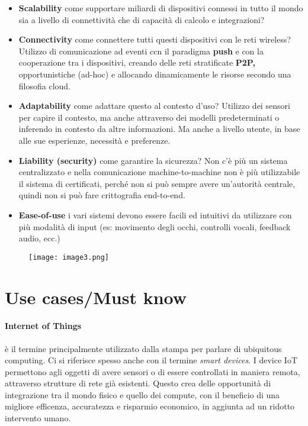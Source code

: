 \begin{itemize}
\item \textbf{Scalability} come supportare miliardi di dispositivi connessi
  in tutto il mondo sia a livello di connettività che di
  capacità di calcolo e integrazioni?

\item \textbf{Connectivity} come connettere tutti questi dispositivi con le
  reti wireless? Utilizzo di comunicazione ad eventi ccn il paradigma
  \textbf{push} e con la cooperazione tra i dispositivi, creando delle
  reti stratificate \textbf{P2P,} opportunistiche (ad-hoc) e allocando
  dinamicamente le risorse secondo una filosofia cloud.

\item \textbf{Adaptability} come adattare questo al contesto d'uso? Utilizzo
  dei sensori per capire il contesto, ma anche attraverso dei modelli
  predeterminati o inferendo in contesto da altre informazioni. Ma anche
  a livello utente, in base alle sue esperienze, necessità e preferenze.

\item \textbf{Liability (security)} come garantire la sicurezza? Non c'è più
  un sistema centralizzato e nella comunicazione machine-to-machine non
  è più utilizzabile il sistema di certificati, perché non si può sempre
  avere un'autorità centrale, quindi non si può fare crittografia
  end-to-end.

\item \textbf{Ease-of-use} i vari sistemi devono essere facili ed intuitivi
  da utilizzare con più modalità di input (es: movimento degli occhi,
  controlli vocali, feedback audio, ecc.)

\end{itemize}

\begin{figure}[H]
 \centering
 \texttt{[image: image3.png]}
\end{figure}

\section{Use cases/Must know}
\label{use-casesmust-know}

\paragraph*{Internet of Things} è il termine principalmente utilizzato dalla
stampa per parlare di ubiquitous computing. Ci si riferisce spesso anche con il 
termine \textit{smart devices}. I device IoT permettono agli oggetti di avere 
sensori o di essere controllati in maniera remota, attraverso strutture di rete 
già esistenti. Questo crea delle opportunità di integrazione tra il mondo 
fisico e quello dei compute, con il beneficio di una migliore efficenza, 
accuratezza e risparmio economico, in aggiunta ad un ridotto intervento umano.

